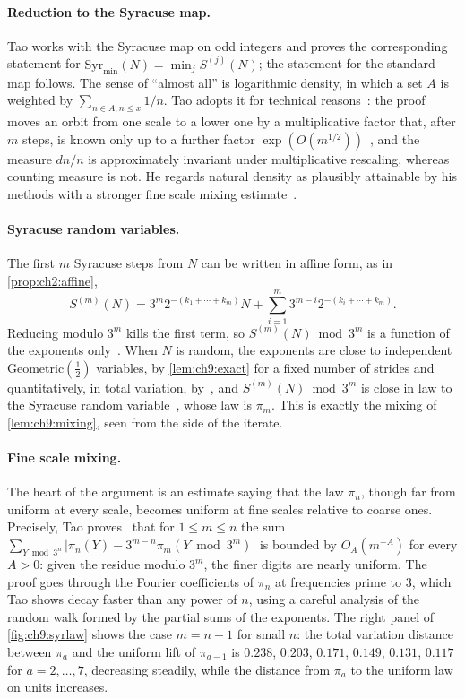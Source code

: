 \begin{sloppypar}
\paragraph{Reduction to the Syracuse map.} Tao works with the Syracuse map on
odd integers and proves the corresponding statement for
$\mathrm{Syr}_{\min}(N)=\min_jS^{(j)}(N)$; the statement for the standard map
follows. The sense of ``almost all'' is logarithmic density, in which a set $A$
is weighted by $\sum_{n\in A,n\le x}1/n$.
Tao adopts it for technical reasons~\cite{tao2022}: the proof moves an orbit from one scale to a lower one by a multiplicative factor that, after $m$ steps, is known only up to a further factor $\exp(O(m^{1/2}))$~\cite[eq.~(1.17)]{tao2022}, and the measure $dn/n$ is approximately invariant under multiplicative rescaling, whereas counting measure is not.
He regards natural density as plausibly attainable by his methods with a stronger fine scale mixing estimate~\cite[Remarks~1.4 and~1.16]{tao2022}.
\end{sloppypar}

\paragraph{Syracuse random variables.} The first $m$ Syracuse steps from $N$
can be written in affine form, as in \cref{prop:ch2:affine},
\[
  S^{(m)}(N)=3^m2^{-(k_1+\cdots+k_m)}N+\sum_{i=1}^{m}3^{m-i}2^{-(k_i+\cdots+k_m)} .
\]
Reducing modulo $3^m$ kills the first term, so $S^{(m)}(N)\bmod3^m$ is a
function of the exponents only~\cite[eq.~(1.21)]{tao2022}. When $N$ is random, the exponents are close to
independent Geometric$(\tfrac12)$ variables, by \cref{lem:ch9:exact} for a fixed number of strides and quantitatively, in total variation, by~\cite[Proposition~1.9]{tao2022}, and
$S^{(m)}(N)\bmod3^m$ is close in law to the Syracuse random variable~\cite[eq.~(1.22)]{tao2022}, whose law
is $\pi_m$. This is exactly the mixing of \cref{lem:ch9:mixing}, seen from the
side of the iterate.

\paragraph{Fine scale mixing.} The heart of the argument is an estimate saying
that the law $\pi_n$, though far from uniform at every scale, becomes uniform
at fine scales relative to coarse ones. Precisely, Tao proves~\cite[Proposition~1.14]{tao2022} that for
$1\le m\le n$ the sum
$\sum_{Y\bmod3^n}\bigl|\pi_n(Y)-3^{m-n}\pi_m(Y\bmod3^m)\bigr|$ is bounded by
$O_A(m^{-A})$ for every $A>0$: given the residue modulo $3^m$, the finer digits
are nearly uniform. The proof goes through the Fourier coefficients of $\pi_n$
at frequencies prime to $3$, which Tao shows decay faster than any power of
$n$, using a careful analysis of the random walk formed by the partial sums of
the exponents. The right panel of \cref{fig:ch9:syrlaw} shows the case $m=n-1$
for small $n$: the total variation distance between $\pi_a$ and the uniform
lift of $\pi_{a-1}$ is $0.238$, $0.203$, $0.171$, $0.149$, $0.131$, $0.117$ for
$a=2,\ldots,7$, decreasing steadily, while the distance from $\pi_a$ to the
uniform law on units increases.

